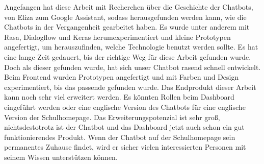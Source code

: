 Angefangen hat diese Arbeit mit Recherchen über die Geschichte der Chatbots, von Eliza zum Google Assistant, sodass herausgefunden werden kann, wie die Chatbots in der Vergangenheit gearbeitet haben.
Es wurde unter anderem mit Rasa, Dialogflow und Keras herumexperimentiert und kleine Prototypen angefertigt, um herauszufinden, welche Technologie benutzt werden sollte.
Es hat eine lange Zeit gedauert, bis der richtige Weg für diese Arbeit gefunden wurde.
Doch als dieser gefunden wurde, hat sich unser Chatbot rasend schnell entwickelt.
Beim Frontend wurden Prototypen angefertigt und mit Farben und Design experimentiert, bis das passende gefunden wurde.
Das Endprodukt dieser Arbeit kann noch sehr viel erweitert werden.
Es könnten Rollen beim Dashboard eingeführt werden oder eine englische Version des Chatbots für eine englische Version der Schulhomepage.
Das Erweiterungspotenzial ist sehr groß, nichtsdestotrotz ist der Chatbot und das Dashboard jetzt auch schon ein gut funktionierendes Produkt.
Wenn der Chatbot auf der Schulhomepage sein permanentes Zuhause findet, wird er sicher vielen interessierten Personen mit seinem Wissen unterstützen können.
